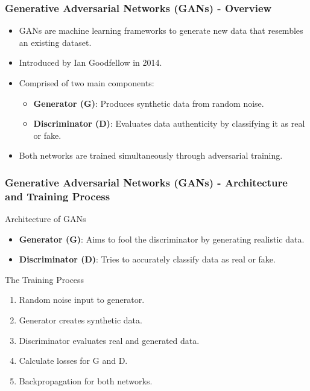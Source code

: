 \documentclass[aspectratio=169]{beamer}
\begin{document}
\begin{frame}[fragile]
    \frametitle{Generative Adversarial Networks (GANs) - Overview}
    \begin{itemize}
        \item GANs are machine learning frameworks to generate new data that resembles an existing dataset.
        \item Introduced by Ian Goodfellow in 2014.
        \item Comprised of two main components:
        \begin{itemize}
            \item \textbf{Generator (G)}: Produces synthetic data from random noise.
            \item \textbf{Discriminator (D)}: Evaluates data authenticity by classifying it as real or fake.
        \end{itemize}
        \item Both networks are trained simultaneously through adversarial training.
    \end{itemize}
\end{frame}

\begin{frame}[fragile]
    \frametitle{Generative Adversarial Networks (GANs) - Architecture and Training Process}
    \begin{block}{Architecture of GANs}
        \begin{itemize}
            \item \textbf{Generator (G)}: Aims to fool the discriminator by generating realistic data.
            \item \textbf{Discriminator (D)}: Tries to accurately classify data as real or fake.
        \end{itemize}
    \end{block}
    
    \vspace{0.2cm}
    
    \begin{block}{The Training Process}
        \begin{enumerate}
            \item Random noise input to generator.
            \item Generator creates synthetic data.
            \item Discriminator evaluates real and generated data.
            \item Calculate losses for G and D.
            \item Backpropagation for both networks.
        \end{enumerate}
    \end{block}
\end{frame}
\end{document}
